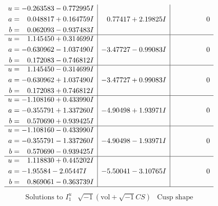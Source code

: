 \documentclass[1p]{elsarticle_modified}
\theoremstyle{definition}
\newcommand{\I}{\sqrt{-1}}
\begin{document}
$$\begin{array}{c|c|c}
\begin{aligned}
u &= -0.263583 - 0.772995 I \\
a &= \phantom{-}0.048817 + 0.164759 I \\
b &= \phantom{-}0.062093 - 0.937483 I\end{aligned}
 & \phantom{-}0.77417 + 2.19825 I & \phantom{-0.000000 } 0 \\ \hline\begin{aligned}
u &= \phantom{-}1.145450 + 0.314699 I \\
a &= -0.630962 - 1.037490 I \\
b &= \phantom{-}0.172083 - 0.746812 I\end{aligned}
 & -3.47727 - 0.99083 I & \phantom{-0.000000 } 0 \\ \hline\begin{aligned}
u &= \phantom{-}1.145450 - 0.314699 I \\
a &= -0.630962 + 1.037490 I \\
b &= \phantom{-}0.172083 + 0.746812 I\end{aligned}
 & -3.47727 + 0.99083 I & \phantom{-0.000000 } 0 \\ \hline\begin{aligned}
u &= -1.108160 + 0.433990 I \\
a &= -0.355791 + 1.337260 I \\
b &= \phantom{-}0.570690 + 0.939425 I\end{aligned}
 & -4.90498 + 1.93971 I & \phantom{-0.000000 } 0 \\ \hline\begin{aligned}
u &= -1.108160 - 0.433990 I \\
a &= -0.355791 - 1.337260 I \\
b &= \phantom{-}0.570690 - 0.939425 I\end{aligned}
 & -4.90498 - 1.93971 I & \phantom{-0.000000 } 0 \\ \hline\begin{aligned}
u &= \phantom{-}1.118830 + 0.445202 I \\
a &= -1.95584 - 2.05447 I \\
b &= \phantom{-}0.869061 - 0.363739 I\end{aligned}
 & -5.50041 - 3.10765 I & \phantom{-0.000000 } 0\\
 \hline 
 \end{array}$$\newpage$$\begin{array}{c|c|c}  
\text{Solutions to }I^u_{1}& \I (\text{vol} + \sqrt{-1}CS) & \text{Cusp shape}\\
 \hline 
\begin{aligned}

\end{aligned}
\end{array}$$
\end{document}
